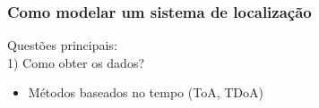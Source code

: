 \documentclass{beamer}
\begin{document}
\begin{frame}
\frametitle{\normalsize Como modelar um sistema de localização}
\begin{flushleft}
	Questões principais: \\
	\hspace{0.5cm} 1) Como obter os dados?
	\begin{itemize}
		\item Métodos baseados no tempo (ToA, TDoA)
	\end{itemize}
	
	\begin{figure}
	\end{figure}
\end{flushleft}
\end{frame}
\end{document}
